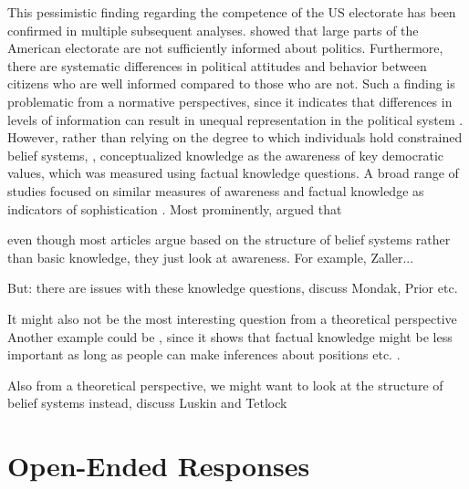 \documentclass[12pt]{article}
\begin{document}
This pessimistic finding regarding the competence of the US electorate has been confirmed in multiple subsequent analyses. \citet{carpini1996americans} showed that large parts of the American electorate are not sufficiently informed about politics. Furthermore, there are systematic differences in political attitudes and behavior between citizens who are well informed compared to those who are not. Such a finding is problematic from a normative perspectives, since it indicates that differences in levels of information can result in unequal representation in the political system \citep[see also][]{althaus1998information,kuklinski2000misinformation,gilens2001political}. However, rather than relying on the degree to which individuals hold constrained belief systems, \citet{carpini1996americans}, conceptualized knowledge as the awareness of key democratic values, which was measured using factual knowledge questions. A broad range of studies focused on similar measures of awareness and factual knowledge as indicators of sophistication \citep[e.g.][]{zaller1991information,jacoby1995structure,gomez2001political}. Most prominently, \citet{zaller1992nature} argued that 

even though most articles argue based on the structure of belief systems rather than basic knowledge, they just look at awareness. For example, Zaller...



But: there are issues with these knowledge questions, discuss Mondak, Prior etc.

It might also not be the most interesting question from a theoretical perspective
Another example could be \citet{lupia1994shortcuts}, since it shows that factual knowledge might be less important as long as people can make inferences about positions etc. \citep[see also][]{lupia2006elitism}.

Also from a theoretical perspective, we might want to look at the structure of belief systems instead, discuss Luskin and Tetlock


\section{Open-Ended Responses}
\end{document}
